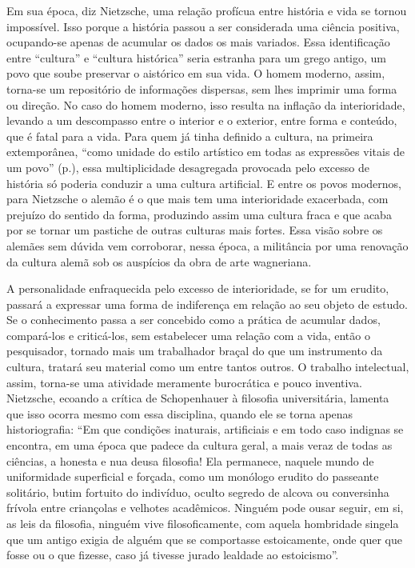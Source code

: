 Em sua época, diz Nietzsche, uma relação profícua entre história e vida
se tornou impossível. Isso porque a história passou a ser considerada
uma ciência positiva, ocupando-se apenas de acumular os dados os mais
variados. Essa identificação entre ``cultura'' e ``cultura histórica''
seria estranha para um grego antigo, um povo que soube preservar o
aistórico em sua vida. O homem moderno, assim, torna-se um repositório
de informações dispersas, sem lhes imprimir uma forma ou direção. No
caso do homem moderno, isso resulta na inflação da interioridade,
levando a um descompasso entre o interior e o exterior, entre forma e
conteúdo, que é fatal para a vida. Para quem já tinha definido a
cultura, na primeira extemporânea, ``como unidade do estilo artístico em
todas as expressões vitais de um povo'' (p.), essa multiplicidade
desagregada provocada pelo excesso de história só poderia conduzir a uma
cultura artificial. E entre os povos modernos, para Nietzsche o alemão é
o que mais tem uma interioridade exacerbada, com prejuízo do sentido da
forma, produzindo assim uma cultura fraca e que acaba por se tornar um
pastiche de outras culturas mais fortes. Essa visão sobre os alemães sem
dúvida vem corroborar, nessa época, a militância por uma renovação da
cultura alemã sob os auspícios da obra de arte wagneriana.

A personalidade enfraquecida pelo excesso de interioridade, se for um
erudito, passará a expressar uma forma de indiferença em relação ao seu
objeto de estudo. Se o conhecimento passa a ser concebido como a prática
de acumular dados, compará-los e criticá-los, sem estabelecer uma
relação com a vida, então o pesquisador, tornado mais um trabalhador
braçal do que um instrumento da cultura, tratará seu material como um
entre tantos outros. O trabalho intelectual, assim, torna-se uma
atividade meramente burocrática e pouco inventiva. Nietzsche, ecoando a
crítica de Schopenhauer à filosofia universitária, lamenta que isso
ocorra mesmo com essa disciplina, quando ele se torna apenas
historiografia: ``Em que condições inaturais, artificiais e em todo caso
indignas se encontra, em uma época que padece da cultura geral, a mais
veraz de todas as ciências, a honesta e nua deusa filosofia! Ela
permanece, naquele mundo de uniformidade superficial e forçada, como um
monólogo erudito do passeante solitário, butim fortuito do indivíduo,
oculto segredo de alcova ou conversinha frívola entre criançolas e
velhotes acadêmicos. Ninguém pode ousar seguir, em si, as leis da
filosofia, ninguém vive filosoficamente, com aquela hombridade singela
que um antigo exigia de alguém que se comportasse estoicamente, onde
quer que fosse ou o que fizesse, caso já tivesse jurado lealdade ao
estoicismo''.


